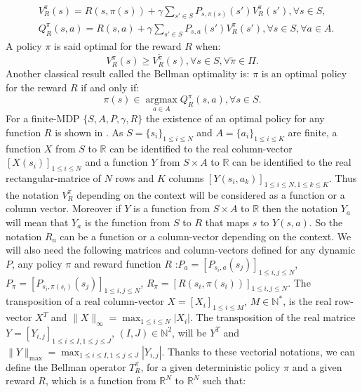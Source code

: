 \documentclass{article} %
\newcommand{\argmax}{\operatorname*{argmax}}
\newcommand{\0}{\mathbf{0}}
\newcommand{\1}{\mathbf{1}}
\begin{document}
\begin{align}
\label{equation: Bellman}
&V^{\pi}_R(s)=R(s,\pi(s))+\gamma\sum_{s'\in S}P_{s,\pi(s)}(s')V^{\pi}_R(s'), \forall s\in S,
\\
&Q^{\pi}_R(s,a)=R(s,a)+\gamma\sum_{s'\in S}P_{s,a}(s')V^{\pi}_R(s'), \forall s\in S, \forall a\in A.
\end{align}
A policy $\pi$ is said optimal for the reward $R$ when:
\begin{equation}
\label{equation:Voptimal}
V^{\pi}_R(s)\geq V^{\tilde{\pi}}_R(s) , \forall s\in S, \forall \tilde{\pi}\in\Pi.
\end{equation}
Another classical result called the Bellman optimality is: $\pi$ is an optimal policy for the reward $R$ if and only if:
\begin{equation}
\label{equation:Qoptimal}
\pi(s)\in\argmax_{a\in A} Q^\pi_R(s,a), \forall s\in S.
\end{equation}
For a finite-MDP $\{S,A,P,\gamma,R\}$ the existence of an optimal policy for any function $R$ is shown in \cite{bertsekas2001dynamic}.
As $S=\{s_i\}_{1\leq i \leq N}$ and $A=\{a_i\}_{1\leq i \leq K}$ are finite, a function $X$ from $S$ to $\mathbb{R}$ can be identified to the real column-vector $[X(s_i)]_{1\leq i \leq N}$ and a function $Y$ from
$S\times A$ to $\mathbb{R}$ can be identified to the real rectangular-matrice of $N$ rows and $K$ columns  $[Y(s_i,a_k)]_{1\leq i \leq N, 1\leq k \leq K}$.
Thus the notation $V^\pi_R$ depending on the context will be considered as a function or a column vector. Moreover if $Y$ is a function from $S\times A$ to $\mathbb{R}$ then the notation $Y_a$ will mean that $Y_a$ is the function from $S$ to $R$ that maps $s$ to $Y(s,a)$. So the notation $R_a$ can be a function or a column-vector depending on the context.
We will also need the following matrices and column-vectors defined for any dynamic $P$, any policy $\pi$ and reward function $R$ :$P_a=[P_{s_i,a}(s_j)]_{1\leq i,j \leq N}$, $P_\pi=[P_{s_i,\pi(s_i)}(s_j)]_{1\leq i,j \leq N}$, $R_\pi=[R(s_i,\pi(s_i))]_{1\leq i,j \leq N}$. The transposition of a real column-vector $X=[X_i]_{1\leq i \leq M}$, $M\in\mathbb{N}^*$, is the real row-vector $X^T$ and $\|X\|_{\infty}=\max_{1\leq i \leq N}|X_i|$. The transposition of the real matrice $Y=[Y_{i,j}]_{1\leq i \leq I, 1\leq j \leq J}$, $(I,J)\in\mathbb{N}^2$, will be $Y^T$ and $\|Y\|_{\text{max}}=\max_{1\leq i \leq I,1\leq j \leq J}|Y_{i,j}|$.  Thanks to these vectorial notations, we can define the Bellman operator $T^\pi_R$, for a given deterministic policy $\pi$ and a given reward $R$, which is a function from $\mathbb{R}^N$ to $\mathbb{R}^N$ such that:
\end{document}
